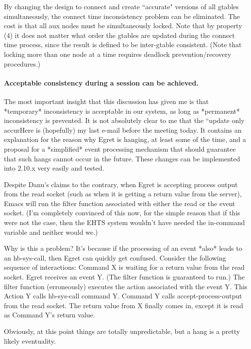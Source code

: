 By changing the design to connect and create ``accurate" versions of 
all gtables simultaneously, the connect time inconsistency problem 
can be eliminated.  The cost is that all aux nodes must be 
simultaneously locked.  Note that by property (4) it does not matter 
what order the gtables are updated during the connect time process, 
since the result is defined to be inter-gtable consistent.  (Note that 
locking more than one node at a time requires deadlock 
prevention/recovery procedures.)

\paragraph{Acceptable consistency during a session can be achieved.}

The most important insight that this discussion has given me is that
*temporary* inconsistency is acceptable in our system, as long as
*permanent* inconsistency is prevented. It is not absolutely clear to
me that the ``update only accurHere is (hopefully) my last e-mail before the meeting today.  It contains
an explanation for the reason why Egret is hanging, at least some of the time, and 
a proposal for a *simplified* event processing mechanism that should guarantee
that such hangs cannot occur in the future.  These changes can be implemented into
2.10.x very easily and tested. 

Despite Danu's claims to the contrary, when Egret is accepting process output from 
the read socket (such as when it is getting a return value from the server), Emacs will
run the filter function associated with either the read or the event socket. (I'm completely convinced of this
now, for the simple reason that if this were not the case, then the EHTS system wouldn't
have needed the in-command variable and neither would we.)

Why is this a problem?  It's because if the processing of an event *also* leads to an hb-sys-call,
then Egret can quickly get confused. Consider the following sequence of interactions:
     Command X is waiting for a return value from the read socket.
     Egret receives an event Y.  (The filter function is guaranteed to run.)
     The filter function (erroneously) executes the action associated with the event Y.
     This Action Y calls hb-sys-call command Y.
     Command Y calls accept-process-output from the read socket.
     The return value from X finally comes in, except it is read as Command Y's return value.

Obviously, at this point things are totally unpredictable, but a hang is a pretty likely eventuality.

